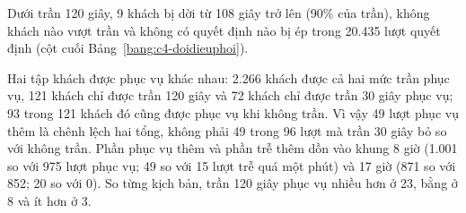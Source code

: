 Dưới trần 120 giây, 9 khách bị dời từ 108 giây trở lên (90\% của trần), không khách nào vượt trần và không có quyết
định nào bị ép trong 20.435 lượt quyết định (cột cuối Bảng~\ref{bang:c4-doidieuphoi}).

Hai tập khách được phục vụ khác nhau: 2.266 khách được cả hai mức trần phục vụ, 121 khách chỉ được trần 120 giây và 72
khách chỉ được trần 30 giây phục vụ; 93 trong 121 khách đó cũng được phục vụ khi không trần. Vì vậy 49 lượt phục vụ
thêm là chênh lệch hai tổng, không phải 49 trong 96 lượt mà trần 30 giây bỏ so với không trần. Phần phục vụ thêm và
phần trễ thêm dồn vào khung 8 giờ (1.001 so với 975 lượt phục vụ; 49 so với 15 lượt trễ quá một phút) và 17 giờ (871
so với 852; 20 so với 0). So từng kịch bản, trần 120 giây phục vụ nhiều hơn ở 23, bằng ở 8 và ít hơn ở 3.

